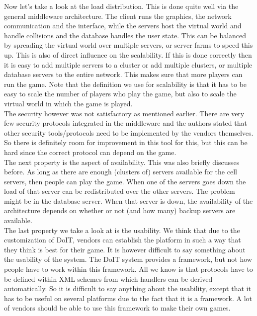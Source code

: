 Now let's take a look at the load distribution. 
This is done quite well via the general middleware architecture. 
The client runs the graphics, the network communication and the interface, while the servers host the virtual world and handle collisions and the database handles the user state. 
This can be balanced by spreading the virtual world over multiple servers, or server farms to speed this up. 
This is also of direct influence on the scalability. 
If this is done correctly then it is easy to add multiple servers to a cluster or add multiple clusters, or multiple database servers to the entire network. 
This makes sure that more players can run the game. 
Note that the definition we use for scalability is that it has to be easy to scale the number of players who play the game, but also to scale the virtual world in which the game is played.\\
The security however was not satisfactory as mentioned earlier. 
There are very few security protocols integrated in the middleware and the authors stated that other security tools/protocols need to be implemented by the vendors themselves. 
So there is definitely room for improvement in this tool for this, but this can be hard since the correct protocol can depend on the game.\\
The next property is the aspect of availability. 
This was also briefly discusses before. 
As long as there are enough (clusters of) servers available for the cell servers, then people can play the game. 
When one of the servers goes down the load of that server can be redistributed over the other servers. 
The problem might be in the database server. When that server is down, the availability of the architecture depends on whether or not (and how many) backup servers are available.\\
The last property we take a look at is the usability.
We think that due to the customization of DoIT, vendors can establish the platform in such a way that they think is best for their game. 
It is however difficult to say something about the usability of the system. 
The DoIT system provides a framework, but not how people have to work within this framework. 
All we know is that protocols have to be defined within XML schemes from which handlers can be derived automatically. 
So it is difficult to say anything about the usability, except that it has to be useful on several platforms due to the fact that it is a framework. 
A lot of vendors should be able to use this framework to make their own games.